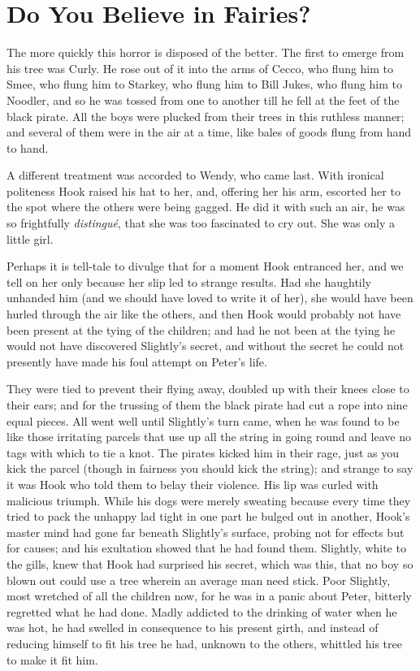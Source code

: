 
\chapter{Do You Believe in Fairies?}

The more quickly this horror is disposed of the better.
The first to emerge from his tree was Curly.
He rose out of it into the arms of Cecco,
who flung him to Smee, who flung him to Starkey, who flung him to Bill Jukes, who flung him to Noodler,
and so he was tossed from one to another till he fell at the feet of the black pirate.
All the boys were plucked from their trees in this ruthless manner;
and several of them were in the air at a time, like bales of goods flung from hand to hand.

A different treatment was accorded to Wendy, who came last.
With ironical politeness Hook raised his hat to her,
and, offering her his arm, escorted her to the spot where the others were being gagged.
He did it with such an air, he was so frightfully \emph{distingué}, that she was too fascinated to cry out.
She was only a little girl.

Perhaps it is tell‐tale to divulge that for a moment Hook entranced her,
and we tell on her only because her slip led to strange results.
Had she haughtily unhanded him (and we should have loved to write it of her),
she would have been hurled through the air like the others,
and then Hook would probably not have been present at the tying of the children;
and had he not been at the tying he would not have discovered Slightly’s secret,
and without the secret he could not presently have made his foul attempt on Peter’s life.

They were tied to prevent their flying away, doubled up with their knees close to their ears;
and for the trussing of them the black pirate had cut a rope into nine equal pieces.
All went well until Slightly’s turn came,
when he was found to be like those irritating parcels that use up all the string in going round
and leave no tags with which to tie a knot.
The pirates kicked him in their rage, just as you kick the parcel
(though in fairness you should kick the string);
and strange to say it was Hook who told them to belay their violence.
His lip was curled with malicious triumph.
While his dogs were merely sweating
because every time they tried to pack the unhappy lad tight in one part he bulged out in another,
Hook’s master mind had gone far beneath Slightly’s surface, probing not for effects but for causes;
and his exultation showed that he had found them.
Slightly, white to the gills, knew that Hook had surprised his secret,
which was this, that no boy so blown out could use a tree wherein an average man need stick.
Poor Slightly, most wretched of all the children now, for he was in a panic about Peter,
bitterly regretted what he had done.
Madly addicted to the drinking of water when he was hot,
he had swelled in consequence to his present girth,
and instead of reducing himself to fit his tree he had,
unknown to the others, whittled his tree to make it fit him.

